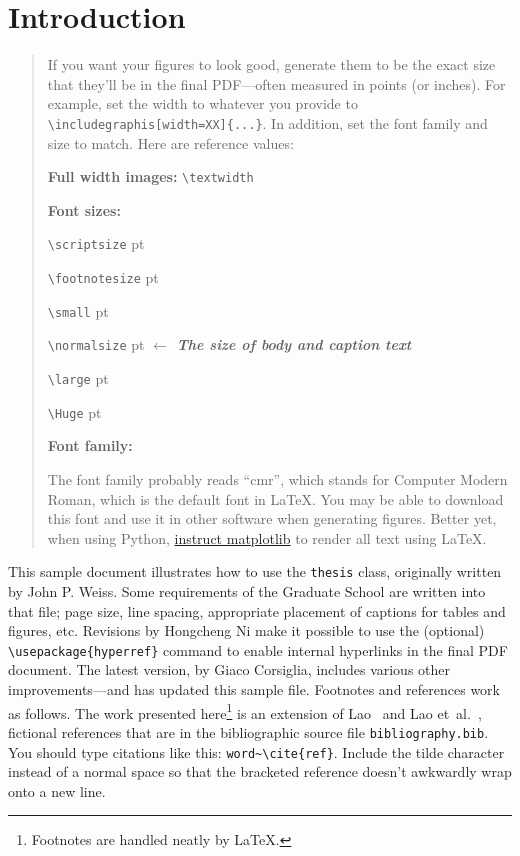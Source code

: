 
\chapter{Introduction}
\label{chp:intro}

\begin{quotation}
	If you want your figures to look good, generate them to be the exact size that
	they'll be in the final PDF---often measured in points (or inches).  For example, set the width to whatever you provide to \verb|\includegraphis[width=XX]{...}|.  In addition, set the font family and size to match.  Here are reference values:

	\textbf{Full width images:}
	\verb|\textwidth| \the\textwidth{}

	\textbf{Font sizes:}

	\makeatletter
	{\scriptsize \verb|\scriptsize|  \f@size{}pt}

	{\footnotesize \verb|\footnotesize| \f@size{}pt}

	{\small \verb|\small| \f@size{}pt}

	{\normalsize \verb|\normalsize| \f@size{}pt} \textit{\textbf{$\leftarrow$	The size of body and caption text}}

	{\large \verb|\large| \f@size{}pt}

	{\Huge \verb|\Huge| \f@size{}pt}
	\makeatother

	\textbf{Font family:}
	\makeatletter
	\f@family
	\makeatother

	The font family probably reads ``cmr'', which stands for Computer Modern Roman, which is the default font in \LaTeX.  You may be able to download this font and use it in other software when generating figures.  Better yet, when using Python, \href{https://matplotlib.org/stable/users/explain/text/usetex.html}{instruct matplotlib} to render all text using \LaTeX{}.

\end{quotation}

This sample document illustrates how to use the \texttt{thesis} class, originally
written by John P. Weiss.  Some requirements of the Graduate School are written
into that file; page size, line spacing, appropriate placement of captions for
tables and figures, etc.  Revisions by Hongcheng Ni make it possible to use the
(optional) \verb|\usepackage{hyperref}| command to enable internal hyperlinks in
the final PDF document.  The latest version, by Giaco Corsiglia, includes
various other improvements---and has updated this sample file.
Footnotes and references work as follows.  The work presented
here\footnote{Footnotes are handled neatly by \LaTeX.} is an extension of
Lao~\cite{lao:thesis} and Lao et~al.~\cite{lao:paper}, fictional references that
are in the bibliographic source file \texttt{bibliography.bib}.  You should type
citations like this: \texttt{word\textasciitilde}\verb|\cite{ref}|.  Include the
tilde character instead of a normal space so that the bracketed reference
doesn't awkwardly wrap onto a new line.

